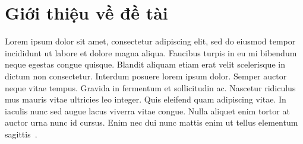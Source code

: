 \section{Giới thiệu về đề tài}
\label{sec:introduction}

Lorem ipsum dolor sit amet, consectetur adipiscing elit, sed do eiusmod tempor
incididunt ut labore et dolore magna aliqua. Faucibus turpis in eu mi bibendum
neque egestas congue quisque. Blandit aliquam etiam erat velit scelerisque in
dictum non consectetur. Interdum posuere lorem ipsum dolor. Semper auctor neque
vitae tempus. Gravida in fermentum et sollicitudin ac. Nascetur ridiculus mus
mauris vitae ultricies leo integer. Quis eleifend quam adipiscing vitae. In
iaculis nunc sed augue lacus viverra vitae congue. Nulla aliquet enim tortor at
auctor urna nunc id cursus. Enim nec dui nunc mattis enim ut tellus elementum
sagittis~\cite{wiki:skein_permutation}.
